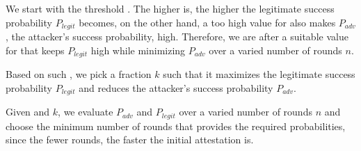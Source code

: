 \begin{mylist}

  \item We start with the threshold \connect. The higher \connect is, the higher the legitimate success probability $P_{legit}$ becomes, on the other hand, a too high value for \connect also makes $P_{adv}$, the attacker's success probability, high. Therefore, we are after a suitable value for \connect that keeps $P_{legit}$ high while minimizing $P_{adv}$ over a varied number of rounds $n$.

  \item Based on such \connect, we pick a fraction $k$ such that it maximizes the legitimate success probability $P_{legit}$ and reduces the attacker's success probability $P_{adv}$.

  \item Given \connect and $k$, we evaluate $P_{adv}$ and $P_{legit}$ over a varied number of rounds $n$ and choose the minimum number of rounds that provides the required probabilities, since the fewer rounds, the faster the initial attestation is.
\end{mylist}


\newcommand{\timeRoundCaption}{\textbf{Effect of different threshold latencies (\connect).} The figure shows the success probability when no relay attack takes place. The threshold latency \connect $=470\ \mu s$ reaches to $0.999999965$ success probability for number of trials at least 20 ($k.n,\ k=0.4$) out of $n=50$ challenge-response protocol.}

\newcommand{\cumulativeCaption}{\textbf{Cumulative distribution function for latencies.} We set the threshold \connect at 470 $\mu s$ which has a cumulative probability of $0.75$ in the experiment where no rerouting attack takes place with an extremely low probability ($9.73\times10^{-5}$).}

